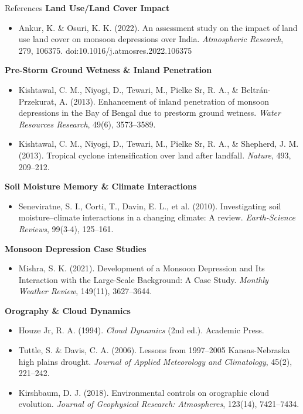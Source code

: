 \documentclass[10pt, aspectratio=169,t,xcolor=table]{beamer}
\begin{document}
\begin{frame}{References}
	\vspace{-0.2cm}
	\footnotesize
	\textbf{Land Use/Land Cover Impact}
	\begin{itemize}\scriptsize
		\item Ankur, K. \& Osuri, K. K. (2022). An assessment study on the impact of land use land cover on monsoon depressions over India. \textit{Atmospheric Research}, 279, 106375. doi:10.1016/j.atmosres.2022.106375
	\end{itemize}

	\vspace{-0.1cm}
	\footnotesize
	\textbf{Pre-Storm Ground Wetness \& Inland Penetration}
	\begin{itemize}\scriptsize
		\item Kishtawal, C. M., Niyogi, D., Tewari, M., Pielke Sr, R. A., \& Beltrán-Przekurat, A. (2013). Enhancement of inland penetration of monsoon depressions in the Bay of Bengal due to prestorm ground wetness. \textit{Water Resources Research}, 49(6), 3573–3589.
		\item Kishtawal, C. M., Niyogi, D., Tewari, M., Pielke Sr, R. A., \& Shepherd, J. M. (2013). Tropical cyclone intensification over land after landfall. \textit{Nature}, 493, 209–212.
	\end{itemize}

	\vspace{-0.1cm}
	\footnotesize
	\textbf{Soil Moisture Memory \& Climate Interactions}
	\begin{itemize}\scriptsize
		\item Seneviratne, S. I., Corti, T., Davin, E. L., et al. (2010). Investigating soil moisture–climate interactions in a changing climate: A review. \textit{Earth-Science Reviews}, 99(3-4), 125–161.
	\end{itemize}

	\vspace{-0.1cm}
	\footnotesize
	\textbf{Monsoon Depression Case Studies}
	\begin{itemize}\scriptsize
		\item Mishra, S. K. (2021). Development of a Monsoon Depression and Its Interaction with the Large-Scale Background: A Case Study. \textit{Monthly Weather Review}, 149(11), 3627–3644.
	\end{itemize}

	\vspace{-0.1cm}
	\footnotesize
	\textbf{Orography \& Cloud Dynamics}
	\begin{itemize}\scriptsize
		\item Houze Jr, R. A. (1994). \textit{Cloud Dynamics} (2nd ed.). Academic Press.
		\item Tuttle, S. \& Davis, C. A. (2006). Lessons from 1997–2005 Kansas-Nebraska high plains drought. \textit{Journal of Applied Meteorology and Climatology}, 45(2), 221–242.
		\item Kirshbaum, D. J. (2018). Environmental controls on orographic cloud evolution. \textit{Journal of Geophysical Research: Atmospheres}, 123(14), 7421–7434.
	\end{itemize}
\end{frame}
\end{document}
